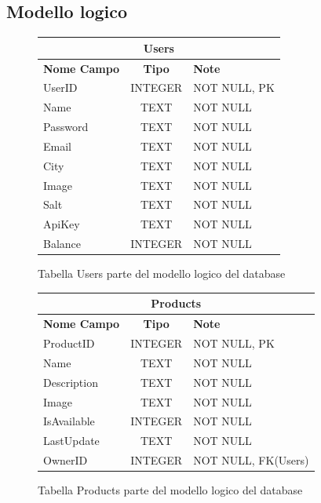 \subsection{Modello logico}
\begin{figure}[ht]
    \centering\begin{tabular}{ |l|c|l| } 
    \hline
    \multicolumn{3}{|c|}{\large\textbf{Users}} \\
    \hline
    \textbf{Nome Campo} & \textbf{Tipo} & \textbf{Note} \\
    \hline
    UserID & INTEGER & NOT NULL, PK \\
    Name & TEXT & NOT NULL \\
    Password & TEXT & NOT NULL \\
    Email & TEXT & NOT NULL \\
    City & TEXT & NOT NULL \\
    Image & TEXT & NOT NULL \\
    Salt & TEXT & NOT NULL \\
    ApiKey & TEXT & NOT NULL \\
    Balance & INTEGER & NOT NULL \\
    \hline
    \end{tabular}
    \caption{Tabella Users parte del modello logico del database}
\end{figure}
\begin{figure}[ht]
    \centering\begin{tabular}{ |l|c|l| } 
    \hline
    \multicolumn{3}{|c|}{\large\textbf{Products}} \\
    \hline
    \textbf{Nome Campo} & \textbf{Tipo} & \textbf{Note} \\
    \hline
    ProductID & INTEGER & NOT NULL, PK \\
    Name & TEXT & NOT NULL \\
    Description & TEXT & NOT NULL \\
    Image & TEXT & NOT NULL \\
    IsAvailable & INTEGER & NOT NULL \\
    LastUpdate & TEXT & NOT NULL \\
    OwnerID & INTEGER & NOT NULL, FK(Users) \\
    \hline
    \end{tabular}
    \caption{Tabella Products parte del modello logico del database}
\end{figure}
